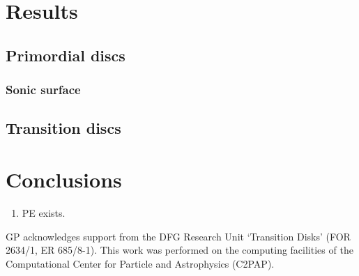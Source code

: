 \documentclass{aa}
\begin{document}
\section{Results}

\subsection{Primordial discs}

\subsubsection{Sonic surface}

\subsection{Transition discs}

\section{Conclusions}

   \begin{enumerate}
      \item PE exists.
   \end{enumerate}

\begin{acknowledgements}
    GP acknowledges support from the DFG Research Unit ‘Transition Disks’ (FOR 2634/1, ER 685/8-1). 
    This work was performed on the computing facilities of the Computational Center for Particle and Astrophysics (C2PAP).
\end{acknowledgements}


{}
\end{document}
